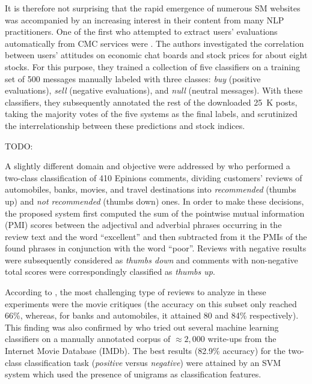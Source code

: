It is therefore not surprising that the rapid emergence of numerous SM
websites was accompanied by an increasing interest in their content
from many NLP practitioners.  One of the first who attempted to
extract users' evaluations automatically from CMC services were
\citet{Das:01}.  The authors investigated the correlation between
users' attitudes on economic chat boards and stock prices for about
eight stocks.  For this purpose, they trained a collection of five
classifiers on a training set of 500 messages manually labeled with
three classes: \emph{buy} (positive evaluations), \emph{sell}
(negative evaluations), and \emph{null} (neutral messages).  With
these classifiers, they subsequently annotated the rest of the
downloaded 25~K posts, taking the majority votes of the five systems
as the final labels, and scrutinized the interrelationship between
these predictions and stock indices.

TODO: \cite{Dave:03}


A slightly different domain and objective were addressed by
\citet{Turney:02} who performed a two-class classification of 410
Epinions comments, dividing customers' reviews of automobiles, banks,
movies, and travel destinations into \emph{recommended} (thumbs up)
and \emph{not recommended} (thumbs down) ones.  In order to make these
decisions, the proposed system first computed the sum of the pointwise
mutual information (PMI) scores between the adjectival and adverbial
phrases occurring in the review text and the word ``excellent'' and
then subtracted from it the PMIs of the found phrases in conjunction
with the word ``poor''.  Reviews with negative results were
subsequently considered as \emph{thumbs down} and comments with
non-negative total scores were correspondingly classified as
\emph{thumbs up}.

According to \citet{Turney:02}, the most challenging type of reviews
to analyze in these experiments were the movie critiques (the accuracy
on this subset only reached 66\%, whereas, for banks and automobiles,
it attained 80 and 84\% respectively).  This finding was also
confirmed by \citet{Pang:02} who tried out several machine learning
classifiers on a manually annotated corpus of $\approx2,000$ write-ups
from the Internet Movie Database (IMDb).  The best results (82.9\%
accuracy) for the two-class classification task (\emph{positive}
versus \emph{negative}) were attained by an SVM system which used the
presence of unigrams as classification features.

